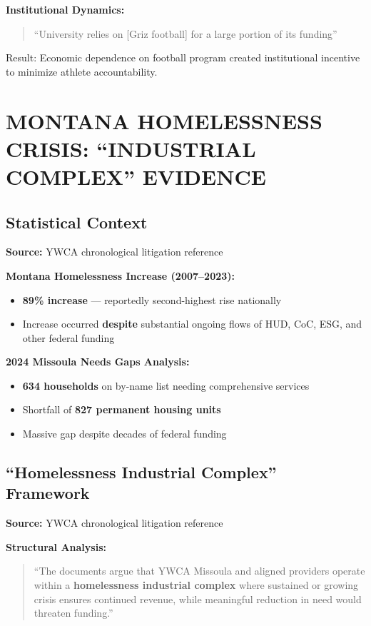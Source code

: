 \documentclass[11pt,letterpaper]{article}
\newenvironment{testimony}{%
    \begin{quote}\itshape\color{DarkGray}%
}{%
    \end{quote}%
}
\begin{document}
\textbf{Institutional Dynamics:}
\begin{testimony}
``University relies on [Griz football] for a large portion of its funding''
\end{testimony}

Result: Economic dependence on football program created institutional incentive to minimize athlete accountability.

\newpage

\section{MONTANA HOMELESSNESS CRISIS: ``INDUSTRIAL COMPLEX'' EVIDENCE}

\subsection{Statistical Context}

\textbf{Source:} YWCA chronological litigation reference

\textbf{Montana Homelessness Increase (2007--2023):}
\begin{itemize}[leftmargin=*]
\item \textbf{89\% increase} --- reportedly second-highest rise nationally
\item Increase occurred \textbf{despite} substantial ongoing flows of HUD, CoC, ESG, and other federal funding
\end{itemize}

\textbf{2024 Missoula Needs Gaps Analysis:}
\begin{itemize}[leftmargin=*]
\item \textbf{634 households} on by-name list needing comprehensive services
\item Shortfall of \textbf{827 permanent housing units}
\item Massive gap despite decades of federal funding
\end{itemize}

\subsection{``Homelessness Industrial Complex'' Framework}

\textbf{Source:} YWCA chronological litigation reference

\textbf{Structural Analysis:}
\begin{testimony}
``The documents argue that YWCA Missoula and aligned providers operate within a \textbf{homelessness industrial complex} where sustained or growing crisis ensures continued revenue, while meaningful reduction in need would threaten funding.''
\end{testimony}
\end{document}
